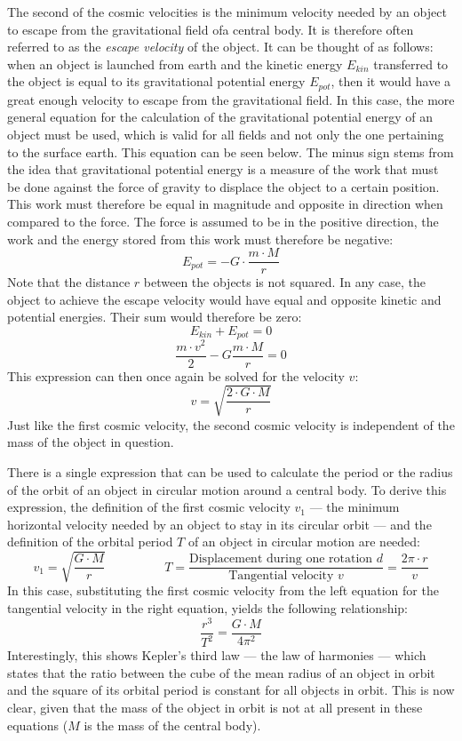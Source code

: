 
The second of the cosmic velocities is the minimum velocity needed by an object to escape from the gravitational field ofa central body. It is therefore often referred to as the \emph{escape velocity} of the object. It can be thought of as follows: when an object is launched from earth and the kinetic energy $E_{kin}$ transferred to the object is equal to its gravitational potential energy $E_{pot}$, then it would have a great enough velocity to escape from the gravitational field. In this case, the more general equation for the calculation of the gravitational potential energy of an object must be used, which is valid for all fields and not only the one pertaining to the surface earth. This equation can be seen below. The minus sign stems from the idea that gravitational potential energy is a measure of the work that must be done against the force of gravity to displace the object to a certain position. This work must therefore be equal in magnitude and opposite in direction when compared to the force. The force is assumed to be in the positive direction, the work and the energy stored from this work must therefore be negative: $$E_{pot} = -G \cdot \frac{m \cdot M}{r}$$ Note that the distance $r$ between the objects is not squared. In any case, the object to achieve the escape velocity would have equal and opposite kinetic and potential energies. Their sum would therefore be zero: $$E_{kin} + E_{pot} = 0$$ $$\frac{m \cdot v^2}{2} -G\frac{m \cdot M}{r} = 0$$ This expression can then once again be solved for the velocity $v$: $$v = \sqrt{\frac{2 \cdot G \cdot M}{r}}$$ Just like the first cosmic velocity, the second cosmic velocity is independent of the mass of the object in question.


There is a single expression that can be used to calculate the period or the radius of the orbit of an object in circular motion around a central body. To derive this expression, the definition of the first cosmic velocity $v_1$ --- the minimum horizontal velocity needed by an object to stay in its circular orbit --- and the definition of the orbital period $T$ of an object in circular motion are needed: $$v_1 = \sqrt{\frac{G \cdot M}{r}} \hspace{2cm} T = \frac{\text{Displacement during one rotation } d}{\text{Tangential velocity } v} = \frac{2 \pi \cdot r}{v}$$ In this case, substituting the first cosmic velocity from the left equation for the tangential velocity in the right equation, yields the following relationship: $$\frac{r^3}{T^2} = \frac{G \cdot M}{4 \pi^2}$$ Interestingly, this shows Kepler's third law --- the law of harmonies --- which states that the ratio between the cube of the mean radius of an object in orbit and the square of its orbital period is constant for all objects in orbit. This is now clear, given that the mass of the object in orbit is not at all present in these equations ($M$ is the mass of the central body).


